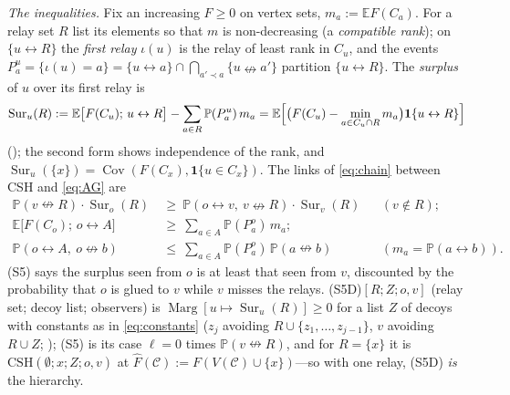 \documentclass[11pt]{article}
\theoremstyle{definition}
\theoremstyle{remark}
\newcommand{\PP}{\mathbb{P}}
\newcommand{\E}{\mathbb{E}}
\DeclareMathOperator{\Cov}{Cov}
\newcommand{\con}{\leftrightarrow}
\newcommand{\ncon}{\nleftrightarrow}
\newcommand{\one}{\mathbf 1}
\newcommand{\eC}{\mathcal{C}}
\newcommand{\Sur}{\operatorname{Sur}}
\newcommand{\Marg}{\operatorname{Marg}}
\newcommand{\CSH}{\mathrm{CSH}}
\begin{document}
\emph{The inequalities.}  Fix an increasing $F\ge0$ on vertex sets, $m_a:=\E F(C_a)$.  For a relay set $R$ list its elements so that $m$ is
non-decreasing (a \emph{compatible rank}); on $\{u\con R\}$ the \emph{first relay} $\iota(u)$ is the relay of least rank in $C_u$, and the events
$P^u_a=\{\iota(u)=a\}=\{u\con a\}\cap\bigcap_{a'\prec a}\{u\ncon a'\}$ partition $\{u\con R\}$.  The \emph{surplus} of $u$ over its first relay is
\begin{equation}\label{eq:Sur}
 \Sur_u(R):=\E\bigl[F(C_u);\,u\con R\bigr]-\sum_{a\in R}\PP(P^u_a)\,m_a=\E\Bigl[\bigl(F(C_u)-\min_{a\in C_u\cap R}m_a\bigr)\one\{u\con R\}\Bigr]
\end{equation}
(); the second form shows independence of the rank, and $\Sur_u(\{x\})=\Cov(F(C_x),\one\{u\in C_x\})$.  The links of
\eqref{eq:chain} between CSH and \eqref{eq:AG} are
\begin{align}
 \PP(v\ncon R)\cdot\Sur_o(R)\ &\ge\ \PP(o\con v,\ v\ncon R)\cdot\Sur_v(R) &&(v\notin R);\tag{S5}\label{eq:S5}\\
 \E\bigl[F(C_o);\,o\con A\bigr]\ &\ge\ \textstyle\sum_{a\in A}\PP(P^o_a)\,m_a;\tag{GEN}\label{eq:GEN}\\
 \PP(o\con A,\ o\ncon b)\ &\le\ \textstyle\sum_{a\in A}\PP(P^o_a)\,\PP(a\ncon b) &&(m_a=\PP(a\con b)).\tag{AG-loc}\label{eq:AGloc}
\end{align}
(S5) says the surplus seen from $o$ is at least that seen from $v$, discounted by the probability that $o$ is glued to $v$ while $v$ misses the
relays.  (S5D)$[R;Z;o,v]$ (relay set; decoy list; observers) is $\Marg[u\mapsto\Sur_u(R)]\ge0$ for a list $Z$ of decoys with constants as in \eqref{eq:constants} ($z_j$ avoiding
$R\cup\{z_1,\dots,z_{j-1}\}$, $v$ avoiding $R\cup Z$; ); (S5) is its case $\ell=0$ times $\PP(v\ncon R)$, and for $R=\{x\}$ it is
$\CSH(\emptyset;x;Z;o,v)$ at $\widehat F(\eC):=F(V(\eC)\cup\{x\})$---so with one relay, (S5D) \emph{is} the hierarchy.
\end{document}
